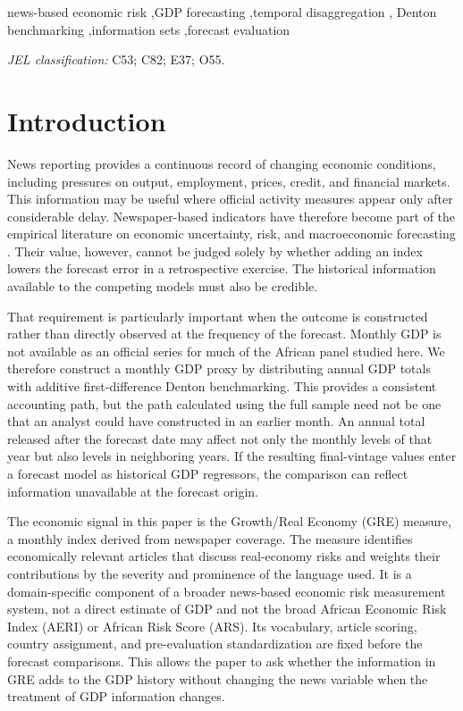\documentclass[preprint,12pt,authoryear]{elsarticle}
\begin{document}
\begin{frontmatter}
\begin{keyword}
news-based economic risk \sep GDP forecasting \sep temporal disaggregation \sep
Denton benchmarking \sep information sets \sep forecast evaluation
\par\medskip\textit{JEL classification:} C53; C82; E37; O55.
\end{keyword}
\end{frontmatter}
\singlespacing

\section{Introduction}

News reporting provides a continuous record of changing economic conditions, including pressures on output, employment, prices, credit, and financial markets. This information may be useful where official activity measures appear only after considerable delay. Newspaper-based indicators have therefore become part of the empirical literature on economic uncertainty, risk, and macroeconomic forecasting \citep{baker2016,ahir2022,caldara2022,adaemmer2025,seo2025}. Their value, however, cannot be judged solely by whether adding an index lowers the forecast error in a retrospective exercise. The historical information available to the competing models must also be credible.

That requirement is particularly important when the outcome is constructed rather than directly observed at the frequency of the forecast. Monthly GDP is not available as an official series for much of the African panel studied here. We therefore construct a monthly GDP proxy by distributing annual GDP totals with additive first-difference Denton benchmarking. This provides a consistent accounting path, but the path calculated using the full sample need not be one that an analyst could have constructed in an earlier month. An annual total released after the forecast date may affect not only the monthly levels of that year but also levels in neighboring years. If the resulting final-vintage values enter a forecast model as historical GDP regressors, the comparison can reflect information unavailable at the forecast origin.

The economic signal in this paper is the Growth/Real Economy (GRE) measure, a monthly index derived from newspaper coverage. The measure identifies economically relevant articles that discuss real-economy risks and weights their contributions by the severity and prominence of the language used. It is a domain-specific component of a broader news-based economic risk measurement system, not a direct estimate of GDP and not the broad African Economic Risk Index (AERI) or African Risk Score (ARS). Its vocabulary, article scoring, country assignment, and pre-evaluation standardization are fixed before the forecast comparisons. This allows the paper to ask whether the information in GRE adds to the GDP history without changing the news variable when the treatment of GDP information changes.
\end{document}
